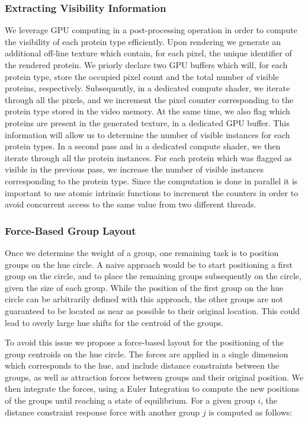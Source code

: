 \documentclass[review,journal]{vgtc}         %
\begin{document}
\subsubsection{Extracting Visibility Information}

We leverage GPU computing in a post-processing operation in order to compute the visibility of each protein type efficiently.
Upon rendering we generate an additional off-line texture which contain, for each pixel, the unique identifier of the rendered protein.
We priorly declare two GPU buffers which will, for each protein type, store the occupied pixel count and the total number of visible proteins, respectively.
Subsequently, in a dedicated compute shader, we iterate through all the pixels, and we increment the pixel counter corresponding to the protein type stored in the video memory.
At the same time, we also flag which proteins are present in the generated texture, in a dedicated GPU buffer.
This information will allow us to determine the number of visible instances for each protein types.
In a second pass and in a dedicated compute shader, we then iterate through all the protein instances.
For each protein which was flagged as visible in the previous pass, we increase the number of visible instances corresponding to the protein type.
Since the computation is done in parallel it is important to use atomic intrinsic functions to increment the counters in order to avoid concurrent access to the same value from two different threads.

\subsubsection{Force-Based Group Layout}

Once we determine the weight of a group, one remaining task is to position groups on the hue circle.
A naive approach would be to start positioning a first group on the circle, and to place the remaining groups subsequently on the circle, given the size of each group.
While the position of the first group on the hue circle can be arbitrarily defined with this approach, the other groups are not guaranteed to be located as near as possible to their original location.
This could lead to overly large hue shifts for the centroid of the groups.

To avoid this issue we propose a force-based layout for the positioning of the group centroids on the hue circle.
The forces are applied in a single dimension which corresponds to the hue, and include distance constraints between the groups, as well as attraction forces between groups and their original position.
We then integrate the forces, using a Euler Integration to compute the new positions of the groups until reaching a state of equilibrium.
For a given group $i$, the distance constraint response force with another group $j$ is computed as follows:
\end{document}
